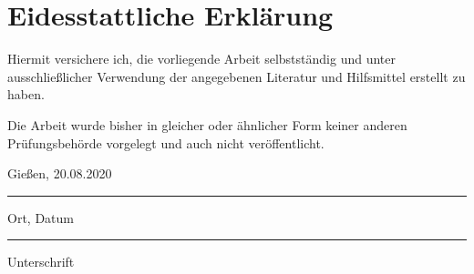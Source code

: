 \section*{Eidesstattliche Erklärung}
	\vspace{1cm}
	Hiermit versichere ich, die vorliegende Arbeit selbstständig und unter ausschließlicher Verwendung der angegebenen Literatur und Hilfsmittel erstellt zu haben.
	
	Die Arbeit wurde bisher in gleicher oder ähnlicher Form keiner anderen Prüfungsbehörde vorgelegt und auch nicht veröffentlicht.
	
	\vspace{2cm}
	\parbox{6cm}{\centering Gießen, 20.08.2020\hrule
		\strut \centering\footnotesize Ort, Datum} \hfill\parbox{6cm}{\hrule
		\strut \centering\footnotesize Unterschrift}
